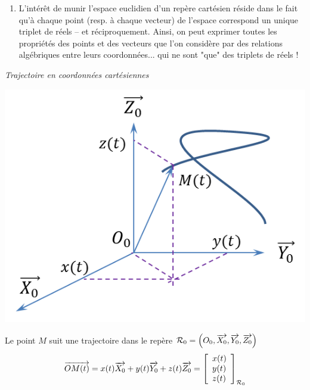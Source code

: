 \documentclass[10pt,oneside]{article}
\begin{document}
\begin{rem}
\begin{enumerate}


\item L'intérêt de munir l'espace euclidien d'un repère cartésien réside dans le fait qu'à chaque point (resp. à chaque vecteur) de l'espace correspond un unique triplet de réels -- et réciproquement.
Ainsi, on peut exprimer toutes les propriétés des points et des vecteurs que l'on considère par des relations algébriques entre
leurs coordonnées... qui ne sont "que" des triplets de réels !
\end{enumerate}

\end{rem}

\begin{exemple}
\textit{Trajectoire en coordonnées cartésiennes}

\begin{minipage}[c]{.47\linewidth}
\begin{center}
\includegraphics[width=.8\textwidth]{png/coord_cartesiennes}
\end{center}
\end{minipage}\hfill
\begin{minipage}[c]{.47\linewidth}
Le point $M$ suit une trajectoire dans le repère $\mathcal{R}_0=\left(O_0, \overrightarrow{X_0},\overrightarrow{Y_0},\overrightarrow{Z_0}\right)$
$$
\overrightarrow{OM(t)}=x(t)\overrightarrow{X_0}+y(t)\overrightarrow{Y_0}+z(t)\overrightarrow{Z_0}
=\left[
\begin{array}{l}
x(t) \\
y(t) \\
z(t) 
\end{array}
\right]_{\mathcal{R}_0}
$$
\end{minipage}
\end{exemple}
\end{document}
